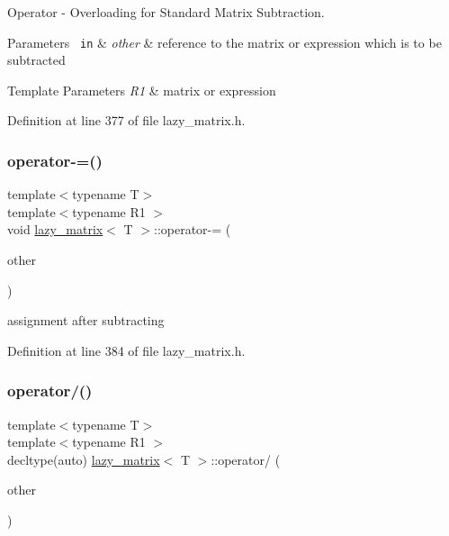 Operator -\/ Overloading for Standard Matrix Subtraction. 


\begin{DoxyParams}[1]{Parameters}
\mbox{\texttt{ in}}  & {\em other} & reference to the matrix or expression which is to be subtracted\\
\hline
\end{DoxyParams}

\begin{DoxyTemplParams}{Template Parameters}
{\em R1} & matrix or expression \\
\hline
\end{DoxyTemplParams}


Definition at line 377 of file lazy\+\_\+matrix.\+h.

\mbox{\label{classlazy__matrix_a9b8a37284dfa4be9423322f409b81c63}} 
\subsubsection{\texorpdfstring{operator-\/=()}{operator-=()}}
{\footnotesize\ttfamily template$<$typename T$>$ \\
template$<$typename R1 $>$ \\
void \mbox{\hyperlink{classlazy__matrix}{lazy\+\_\+matrix}}$<$ T $>$\+::operator-\/= (\begin{DoxyParamCaption}\item[{const R1 \&}]{other }\end{DoxyParamCaption})\hspace{0.3cm}{\ttfamily [inline]}}



assignment after subtracting 



Definition at line 384 of file lazy\+\_\+matrix.\+h.

\mbox{\label{classlazy__matrix_ad63bef3225861a4845772934bed6dfa4}} 
\subsubsection{\texorpdfstring{operator/()}{operator/()}}
{\footnotesize\ttfamily template$<$typename T$>$ \\
template$<$typename R1 $>$ \\
decltype(auto) \mbox{\hyperlink{classlazy__matrix}{lazy\+\_\+matrix}}$<$ T $>$\+::operator/ (\begin{DoxyParamCaption}\item[{const R1 \&}]{other }\end{DoxyParamCaption})\hspace{0.3cm}{\ttfamily [inline]}}



